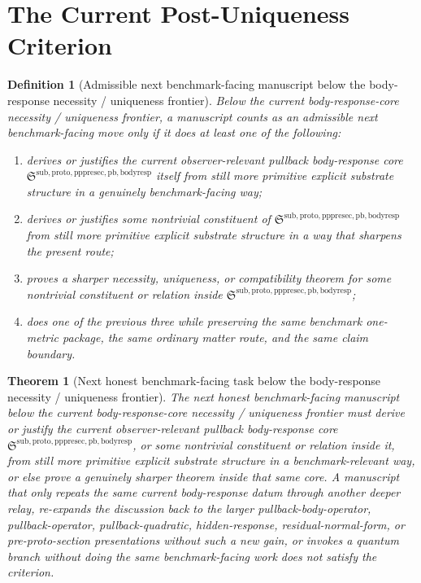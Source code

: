 \documentclass[11pt]{article}
\newcommand{\PullbackBodyResponseCore}{\mathfrak S^{\mathrm{sub,proto,pppresec,pb,bodyresp}}}
\newtheorem{definition}{Definition}
\newtheorem{theorem}{Theorem}
\begin{document}
\section{The Current Post-Uniqueness Criterion}

\begin{definition}[Admissible next benchmark-facing manuscript below the body-response necessity / uniqueness frontier]
Below the current body-response-core necessity / uniqueness frontier, a manuscript counts as an admissible next benchmark-facing move only if it does at least one of the following:
\begin{enumerate}
    \item derives or justifies the current observer-relevant pullback body-response core \(\PullbackBodyResponseCore\) itself from still more primitive explicit substrate structure in a genuinely benchmark-facing way;
    \item derives or justifies some nontrivial constituent of \(\PullbackBodyResponseCore\) from still more primitive explicit substrate structure in a way that sharpens the present route;
    \item proves a sharper necessity, uniqueness, or compatibility theorem for some nontrivial constituent or relation inside \(\PullbackBodyResponseCore\);
    \item does one of the previous three while preserving the same benchmark one-metric package, the same ordinary matter route, and the same claim boundary.
\end{enumerate}
\end{definition}

\begin{theorem}[Next honest benchmark-facing task below the body-response necessity / uniqueness frontier]
The next honest benchmark-facing manuscript below the current body-response-core necessity / uniqueness frontier must derive or justify the current observer-relevant pullback body-response core \(\PullbackBodyResponseCore\), or some nontrivial constituent or relation inside it, from still more primitive explicit substrate structure in a benchmark-relevant way, or else prove a genuinely sharper theorem inside that same core. A manuscript that only repeats the same current body-response datum through another deeper relay, re-expands the discussion back to the larger pullback-body-operator, pullback-operator, pullback-quadratic, hidden-response, residual-normal-form, or pre-proto-section presentations without such a new gain, or invokes a quantum branch without doing the same benchmark-facing work does not satisfy the criterion.
\end{theorem}
\end{document}
